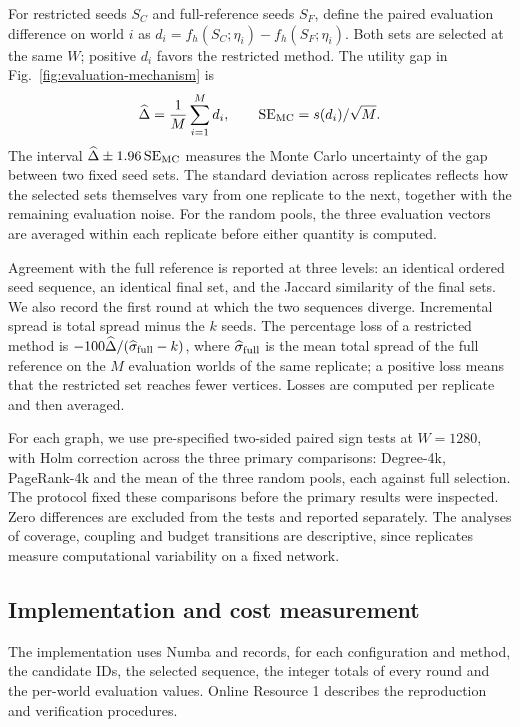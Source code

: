 \documentclass[smallextended]{svjour3}
\begin{document}
For restricted seeds $S_C$ and full-reference seeds $S_F$, define the paired evaluation difference on world $i$ as $d_i=f_h(S_C;\eta_i)-f_h(S_F;\eta_i)$. Both sets are selected at the same $W$; positive $d_i$ favors the restricted method. The utility gap in Fig.~\ref{fig:evaluation-mechanism} is
\begin{equation}
\widehat\Delta=\frac{1}{M}\sum_{i=1}^{M}d_i,
\qquad \operatorname{SE}_{\rm MC}=s(d_i)/\sqrt M.
\end{equation}
The interval $\widehat\Delta\pm1.96\operatorname{SE}_{\rm MC}$ measures the Monte Carlo uncertainty of the gap between two fixed seed sets. The standard deviation across replicates reflects how the selected sets themselves vary from one replicate to the next, together with the remaining evaluation noise. For the random pools, the three evaluation vectors are averaged within each replicate before either quantity is computed.

Agreement with the full reference is reported at three levels: an identical ordered seed sequence, an identical final set, and the Jaccard similarity of the final sets. We also record the first round at which the two sequences diverge. Incremental spread is total spread minus the $k$ seeds. The percentage loss of a restricted method is $-100\widehat\Delta/(\widehat\sigma_{\rm full}-k)$, where $\widehat\sigma_{\rm full}$ is the mean total spread of the full reference on the $M$ evaluation worlds of the same replicate; a positive loss means that the restricted set reaches fewer vertices. Losses are computed per replicate and then averaged.

For each graph, we use pre-specified two-sided paired sign tests at $W=1280$, with Holm correction across the three primary comparisons: Degree-4k, PageRank-4k and the mean of the three random pools, each against full selection. The protocol fixed these comparisons before the primary results were inspected. Zero differences are excluded from the tests and reported separately. The analyses of coverage, coupling and budget transitions are descriptive, since replicates measure computational variability on a fixed network.

\subsection{Implementation and cost measurement}\label{sec:cost}
The implementation uses Numba and records, for each configuration and method, the candidate IDs, the selected sequence, the integer totals of every round and the per-world evaluation values. Online Resource 1 describes the reproduction and verification procedures.
\end{document}
